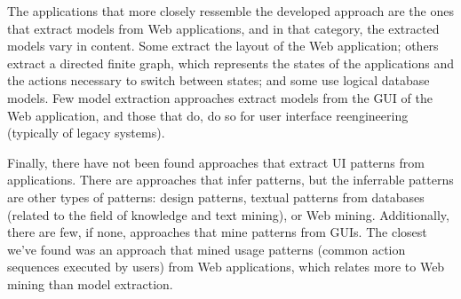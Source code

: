 The applications that more closely ressemble the developed approach are the ones that extract models from Web applications, and in that category, the extracted models vary in content. Some extract the layout of the Web application; others extract a directed finite graph, which represents the states of the applications and the actions necessary to switch between states; and some use logical database models. Few model extraction approaches extract models from the GUI of the Web application, and those that do, do so for user interface reengineering (typically of legacy systems).

Finally, there have not been found approaches that extract UI patterns from applications. There are approaches that infer patterns, but the inferrable patterns are other types of patterns: design patterns, textual patterns from databases (related to the field of knowledge and text mining), or Web mining. Additionally, there are few, if none, approaches that mine patterns from GUIs. The closest we've found was an approach that mined usage patterns (common action sequences executed by users) from Web applications, which relates more to Web mining than model extraction.
